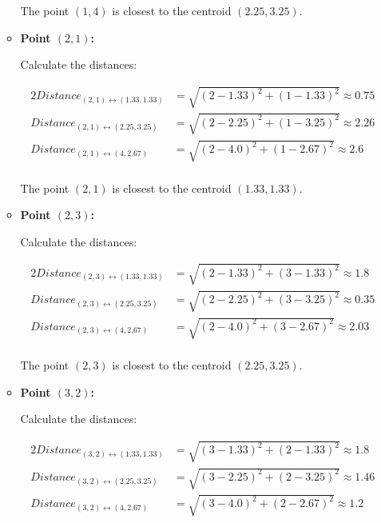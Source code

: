 \documentclass[
english,
smallborders
]{i6prcsht}
\begin{document}
\begin{solution}
\begin{enumerate}
\begin{itemize}
			            The point $(1,4)$ is closest to the centroid $(2.25,3.25)$.
			            
			      \item \textbf{Point $(2,1)$:}
			            
			            Calculate the distances:
			            
			            \begin{alignat*}{2}
				            Distance_{(2,1)\leftrightarrow(1.33,1.33)} & = \sqrt{(2-1.33)^2+(1-1.33)^2} \approx 0.75 \\
				            Distance_{(2,1)\leftrightarrow(2.25,3.25)} & = \sqrt{(2-2.25)^2+(1-3.25)^2} \approx 2.26 \\
				            Distance_{(2,1)\leftrightarrow(4,2.67)}    & = \sqrt{(2-4.0)^2+(1-2.67)^2} \approx 2.6   \\
			            \end{alignat*}
			            
			            The point $(2,1)$ is closest to the centroid $(1.33,1.33)$.
			            
			      \item \textbf{Point $(2,3)$:}
			            
			            Calculate the distances:
			            
			            \begin{alignat*}{2}
				            Distance_{(2,3)\leftrightarrow(1.33,1.33)} & = \sqrt{(2-1.33)^2+(3-1.33)^2} \approx 1.8  \\
				            Distance_{(2,3)\leftrightarrow(2.25,3.25)} & = \sqrt{(2-2.25)^2+(3-3.25)^2} \approx 0.35 \\
				            Distance_{(2,3)\leftrightarrow(4,2.67)}    & = \sqrt{(2-4.0)^2+(3-2.67)^2} \approx 2.03  \\
			            \end{alignat*}
			            
			            The point $(2,3)$ is closest to the centroid $(2.25,3.25)$.
			            
			      \item \textbf{Point $(3,2)$:}
			            
			            Calculate the distances:
			            
			            \begin{alignat*}{2}
				            Distance_{(3,2)\leftrightarrow(1.33,1.33)} & = \sqrt{(3-1.33)^2+(2-1.33)^2} \approx 1.8  \\
				            Distance_{(3,2)\leftrightarrow(2.25,3.25)} & = \sqrt{(3-2.25)^2+(2-3.25)^2} \approx 1.46 \\
				            Distance_{(3,2)\leftrightarrow(4,2.67)}    & = \sqrt{(3-4.0)^2+(2-2.67)^2} \approx 1.2   \\
			            \end{alignat*}
			            

\end{itemize}
\end{enumerate}
\end{solution}
\end{document}
